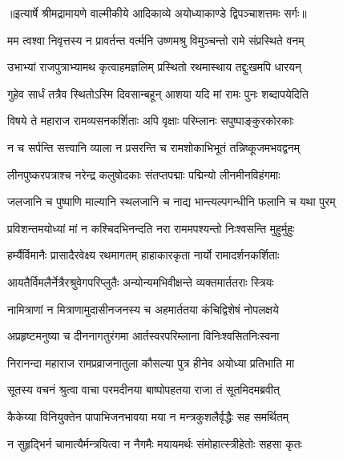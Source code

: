 {॥इत्यार्षे श्रीमद्रामायणे वाल्मीकीये आदिकाव्ये अयोध्याकाण्डे द्विपञ्चाशत्तमः सर्गः॥}


\twolineshloka
{मम त्वश्वा निवृत्तस्य न प्रावर्तन्त वर्त्मनि}
{उष्णमश्रु विमुञ्चन्तो रामे संप्रस्थिते वनम्} %

\twolineshloka
{उभाभ्यां राजपुत्राभ्यामथ कृत्वाहमज्ञलिम्}
{प्रस्थितो रथमास्थाय तद्दुःखमपि धारयन्} %

\twolineshloka
{गुहेव सार्धं तत्रैव स्थितोऽस्मि दिवसान्बहून्}
{आशया यदि मां रामः पुनः शब्दापयेदिति} %

\twolineshloka
{विषये ते महाराज रामव्यसनकर्शिताः}
{अपि वृक्षाः परिम्लानः सपुष्पाङ्कुरकोरकाः} %

\twolineshloka
{न च सर्पन्ति सत्त्वानि व्याला न प्रसरन्ति च}
{रामशोकाभिभूतं तन्निष्कूजमभवद्वनम्} %

\twolineshloka
{लीनपुष्करपत्राश्च नरेन्द्र कलुषोदकाः}
{संतप्तपद्माः पद्मिन्यो लीनमीनविहंगमाः} %

\twolineshloka
{जलजानि च पुष्पाणि माल्यानि स्थलजानि च}
{नाद्य भान्त्यल्पगन्धीनि फलानि च यथा पुरम्} %

\twolineshloka
{प्रविशन्तमयोध्यां मां न कश्चिदभिनन्दति}
{नरा राममपश्यन्तो निःश्वसन्ति मुहुर्मुहुः} %

\twolineshloka
{हर्म्यैर्विमानैः प्रासादैरवेक्ष्य रथमागतम्}
{हाहाकारकृता नार्यो रामादर्शनकर्शिताः} %

\twolineshloka
{आयतैर्विमलैर्नेत्रैरश्रुवेगपरिप्लुतैः}
{अन्योन्यमभिवीक्षन्ते व्यक्तमार्ततराः स्त्रियः} %

\twolineshloka
{नामित्राणां न मित्राणामुदासीनजनस्य च}
{अहमार्ततया कंचिद्विशेषं नोपलक्षये} %

\twolineshloka
{अप्रहृष्टमनुष्या च दीननागतुरंगमा}
{आर्तस्वरपरिम्लाना विनिःश्वसितनिःस्वना} %

\twolineshloka
{निरानन्दा महाराज रामप्रव्राजनातुला}
{कौसल्या पुत्र हीनेव अयोध्या प्रतिभाति मा} %

\twolineshloka
{सूतस्य वचनं श्रुत्वा वाचा परमदीनया}
{बाष्पोपहतया राजा तं सूतमिदमब्रवीत्} %

\twolineshloka
{कैकेय्या विनियुक्तेन पापाभिजनभावया}
{मया न मन्त्रकुशलैर्वृद्धैः सह समर्थितम्} %

\twolineshloka
{न सुहृद्भिर्न चामात्यैर्मन्त्रयित्वा न नैगमैः}
{मयायमर्थः संमोहात्स्त्रीहेतोः सहसा कृतः} %

